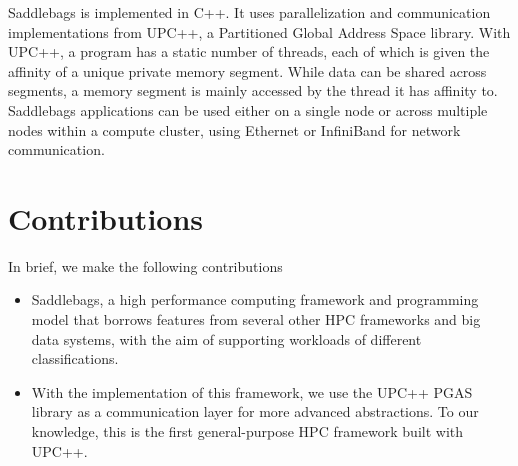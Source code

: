 \documentclass{uit-report}
\begin{document}
Saddlebags is implemented in C++. It uses parallelization and communication implementations from UPC++, a Partitioned Global Address Space library. With UPC++, a program has a static number of threads, each of which is given the affinity of a unique private memory segment. While data can be shared across segments, a memory segment is mainly accessed by the thread it has affinity to. Saddlebags applications can be used either on a single node or across multiple nodes within a compute cluster, using Ethernet or InfiniBand for network communication.









\newpage
\section{Contributions}
In brief, we make the following contributions

\begin{itemize}
	\item Saddlebags, a high performance computing framework and programming model that borrows features from several other HPC frameworks and big data systems, with the aim of supporting workloads of different classifications.
	\item With the implementation of this framework, we use the UPC++ PGAS library as a communication layer for more advanced abstractions. To our knowledge, this is the first general-purpose HPC framework built with UPC++.
\end{itemize}






\end{document}
